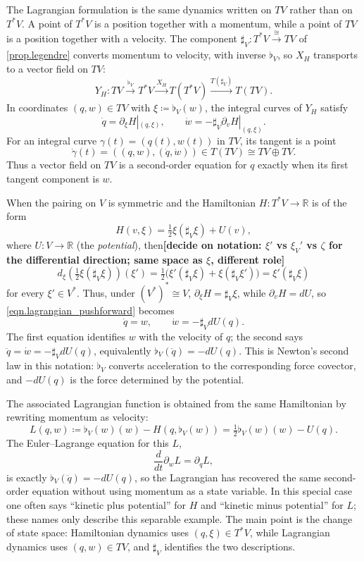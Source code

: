 \documentclass[11pt, oneside, article]{memoir}
\theoremstyle{definition}
\theoremstyle{plain}
\newenvironment{remark}
  {\pushQED{\qed}\renewcommand{\qedsymbol}{$\lozenge$}\remarkx}
  {\popQED\endremarkx}
\newcommand{\To}[2][]{\xrightarrow[#1]{#2}}
\newcommand{\rr}{\mathbb{R}}
\begin{document}
\begin{remark}[Lagrangian formulation]\label{rmk.lagrangian}
The Lagrangian formulation is the same dynamics written on $TV$ rather than on $T^*V$. A point of $T^*V$ is a position together with a momentum, while a point of $TV$ is a position together with a velocity. The component $\sharp_V\colon T^*V\To{\cong}TV$ of \cref{prop.legendre} converts momentum to velocity, with inverse $\flat_V$, so $X_H$ transports to a vector field on $TV$:
\[
Y_H\colon
TV\To{\flat_V}T^*V\To{X_H}T(T^*V)\To{T(\sharp_V)}T(TV).
\]
In coordinates $(q,w)\in TV$ with $\xi\coloneqq\flat_V(w)$, the integral curves of $Y_H$ satisfy
\begin{equation}\label{eqn.lagrangian_pushforward}
\dot q=\partial_\xi H|_{(q,\xi)},\qquad \dot w=-\sharp_V\partial_v H|_{(q,\xi)}.
\end{equation}
For an integral curve $\gamma(t)=(q(t),w(t))$ in $TV$, its tangent is a point
\[
\dot\gamma(t)=((q,w),(\dot q,\dot w))\in T(TV)\cong TV\oplus TV.
\]
Thus a vector field on $TV$ is a second-order equation for $q$ exactly when its first tangent component is $w$.

When the pairing on $V$ is symmetric and the Hamiltonian $H\colon T^*V\to\rr$ is of the form
\[
H(v,\xi)=\tfrac{1}{2}\xi(\sharp_V\xi)+U(v),
\]
where $U\colon V\to\rr$ (the \emph{potential}), then\textbf{[decide on notation: $\xi'$ vs $\xi_V'$ vs $\zeta$ for the differential direction; same space as $\xi$, different role]}
\[
d_\xi\left(\tfrac{1}{2}\xi(\sharp_V\xi)\right)(\xi')
=\tfrac{1}{2}\bigl(\xi'(\sharp_V\xi)+\xi(\sharp_V\xi')\bigr)
=\xi'(\sharp_V\xi)
\]
for every $\xi'\in V^*$. Thus, under $(V^*)^*\cong V$, $\partial_\xi H=\sharp_V\xi$, while $\partial_v H=dU$, so \eqref{eqn.lagrangian_pushforward} becomes
\[
\dot q=w,\qquad \dot w=-\sharp_V dU(q).
\]
The first equation identifies $w$ with the velocity of $q$; the second says $\ddot q=\dot w=-\sharp_V dU(q)$, equivalently $\flat_V(\ddot q)=-dU(q)$. This is Newton's second law in this notation: $\flat_V$ converts acceleration to the corresponding force covector, and $-dU(q)$ is the force determined by the potential.

The associated Lagrangian function is obtained from the same Hamiltonian by rewriting momentum as velocity:
\[
L(q,w)\coloneqq \flat_V(w)(w)-H(q,\flat_V(w))
=\tfrac{1}{2}\flat_V(w)(w)-U(q).
\]
The Euler--Lagrange equation for this $L$,
\[
\frac{d}{dt}\partial_w L=\partial_q L,
\]
is exactly $\flat_V(\ddot q)=-dU(q)$, so the Lagrangian has recovered the same second-order equation without using momentum as a state variable.
In this special case one often says ``kinetic plus potential'' for $H$ and ``kinetic minus potential'' for $L$; these names only describe this separable example. The main point is the change of state space: Hamiltonian dynamics uses $(q,\xi)\in T^*V$, while Lagrangian dynamics uses $(q,w)\in TV$, and $\sharp_V$ identifies the two descriptions.\qedhere
\end{remark}



\printbibliography
\end{document}
